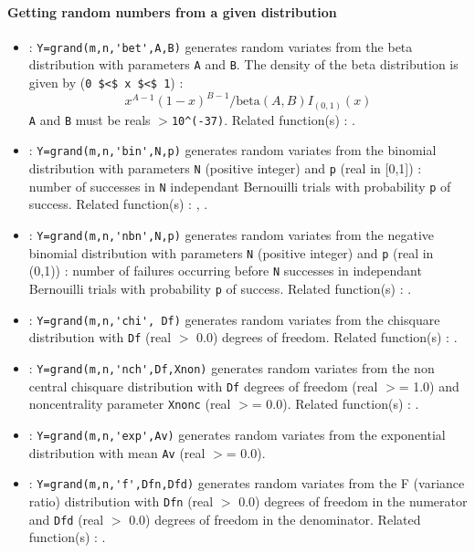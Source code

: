 \paragraph{Getting random numbers from a given distribution}
\begin{itemize}
\item {} : \verb!Y=grand(m,n,'bet',A,B)! generates random variates from 
  the beta distribution with parameters \verb!A! and \verb!B!. 
  The density of the beta distribution is given by  (\verb!0 $<$ x $<$ 1!) :
  \[
  x^{A-1}(1-x)^{B-1}/ \mbox{beta}(A,B) I_{(0,1)}(x)
  \]
  \verb!A! and \verb!B! must be reals $>$\verb!10^(-37)!.
  Related function(s) :  .
\item {} 
  : \verb!Y=grand(m,n,'bin',N,p)!  generates random variates from the binomial 
  distribution with parameters \verb!N! (positive integer) and \verb!p!
  (real in [0,1]) : number of successes in \verb!N! independant 
  Bernouilli trials with probability \verb!p! of success. 
  Related function(s) :  ,  .
\item {} 
  : \verb!Y=grand(m,n,'nbn',N,p)! generates random variates from the negative binomial 
  distribution with parameters \verb!N! (positive integer) and \verb!p! (real 
  in (0,1)) : number of failures occurring before \verb!N! successes 
  in independant Bernouilli trials with probability \verb!p! of success.
  Related function(s) :  .
  
\item {} 
  : \verb!Y=grand(m,n,'chi', Df)! generates random variates from the chisquare distribution 
  with \verb!Df! (real $>$ 0.0) degrees of freedom. 
  Related function(s) :  .  
  
\item {} 
  : \verb!Y=grand(m,n,'nch',Df,Xnon)! generates random variates from the non central chisquare
  distribution with \verb!Df! degrees of freedom (real $>$= 1.0) 
  and noncentrality parameter \verb!Xnonc! (real $>$= 0.0).
  Related function(s) :  .
  
\item {} : \verb!Y=grand(m,n,'exp',Av)! generates random variates from the exponential
  distribution with mean \verb!Av! (real $>$= 0.0).
\item {} 
  : \verb!Y=grand(m,n,'f',Dfn,Dfd)! generates random variates from the F 
  (variance ratio) distribution with \verb!Dfn! (real $>$ 0.0)
  degrees of freedom in the numerator and \verb!Dfd! (real $>$ 0.0) 
  degrees of freedom in the denominator. Related function(s) :  .
  

\end{itemize}
